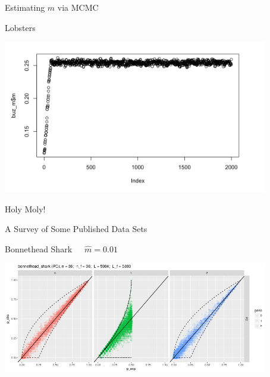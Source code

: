 \documentclass[letter,graphicx]{beamer}
\begin{document}
\begin{frame}{Estimating $m$ via MCMC}
\begin{center}
Lobsters\\
\vspace*{1em}

\includegraphics[width=0.87\textwidth]{./images/lobster-trace.png}
\end{center}
Holy Moly!
\end{frame}





\begin{frame}{A Survey of Some Published Data Sets}

\begin{center}
Bonnethead Shark~~~$\hat{m} = 0.01$
\vspace*{1.5em}

\includegraphics[width=0.87\textwidth]{./images/bonnethead_shark_big_pop.png}
\end{center}
\end{frame}
\end{document}

